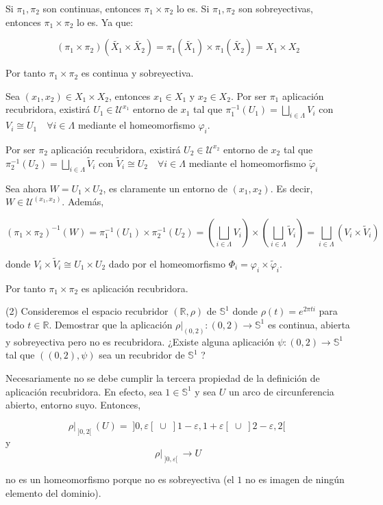 \documentclass[
  a4paper,
  spanish,
  12pt,
]{scrartcl}
\begin{document}
\begin{sol}
Si $\pi_1, \pi_2$ son continuas, entonces $\pi_1 \times \pi_2$ lo es.
Si $\pi_1, \pi_2$ son sobreyectivas, entonces $\pi_1 \times \pi_2$ lo es. Ya que:

$$
(\pi_1 \times \pi_2)(\tilde{X_1} \times \tilde{X_2}) = \pi_1(\tilde{X_1}) \times \pi_1(\tilde{X_2}) = X_1 \times X_2
$$

Por tanto $\pi_1 \times \pi_2$ es continua y sobreyectiva.

Sea $(x_1, x_2) \in X_1 \times X_2$, entonces $x_1 \in X_1$ y $x_2 \in X_2$.
Por ser $\pi_1$ aplicación recubridora, existirá $U_1 \in \mathcal{U}^{x_1}$ entorno de $x_1$ tal que
$\pi_1^{-1}(U_1) = \bigsqcup_{i \in \Lambda} V_i$ con $V_i \cong U_1 \quad \forall i \in \Lambda$ mediante
el homeomorfismo $\varphi_i$.

Por ser $\pi_2$ aplicación recubridora, existirá $U_2 \in \mathcal{U}^{x_2}$ entorno de $x_2$ tal que
$\pi_2^{-1}(U_2) = \bigsqcup_{i \in \Lambda} \tilde{V}_i$ con $\tilde{V}_i \cong U_2 \quad \forall i \in \Lambda$ mediante
el homeomorfismo $\tilde{\varphi}_i$

Sea ahora $W = U_1 \times U_2$, es claramente un entorno de $(x_1, x_2)$. Es decir, $W \in \mathcal{U}^{(x_1, x_2)}$.
Además,

$$
(\pi_1 \times \pi_2)^{-1}(W) = \pi_1^{-1}(U_1) \times \pi_2^{-1}(U_2) = 
\left(\bigsqcup_{i \in \Lambda} V_i \right)  \times \left(\bigsqcup_{i \in \Lambda} \tilde{V}_i \right) 
= \bigsqcup_{i \in \Lambda} (V_i \times \tilde{V}_i )
$$

donde $V_i \times \tilde{V}_i \cong U_1 \times U_2$ dado por el homeomorfismo $\Phi_i = \varphi_i \times \tilde{\varphi}_i$.

Por tanto $\pi_1 \times \pi_2$ es aplicación recubridora.
\end{sol}

\begin{ejer}
(2) Consideremos el espacio recubridor $(\mathbb{R}, \rho)$ de $\mathbb{S}^{1}$ donde $\rho(t)=e^{2 \pi t i}$ para todo $t \in \mathbb{R}$. Demostrar que la aplicación $\left.\rho\right|_{(0,2)}:(0,2) \rightarrow \mathbb{S}^{1}$ es continua, abierta y sobreyectiva pero no es recubridora. ¿Existe alguna aplicación $\psi:(0,2) \rightarrow \mathbb{S}^{1}$ tal que $((0,2), \psi)$ sea un recubridor de $\mathbb{S}^{1}$ ?\\
\end{ejer}

\begin{sol}
Necesariamente no se debe cumplir la tercera propiedad de la definición de aplicación recubridora.
En efecto, sea $1 \in \mathbb{S}^1$ y sea $U$ un arco de circunferencia abierto, entorno suyo. Entonces,

$$
\rho\vert_{\;]0,2[\;} (U) = \;]0, \varepsilon[\; \cup \;]1-\varepsilon, 1+\varepsilon[\; \cup \;]2-\varepsilon, 2[\;
$$
y 
$$
\rho\vert_{\;]0, \varepsilon[\;} \to U
$$

no es un homeomorfismo porque no es sobreyectiva (el \( 1 \) no es imagen de ningún elemento del dominio).

\end{sol}
\end{document}
